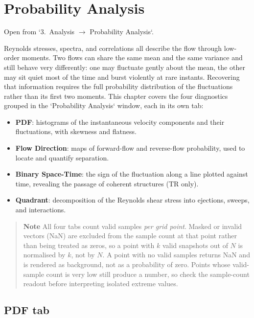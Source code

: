 \section{Probability Analysis}
\label{ch:probability}

Open from `3.\ Analysis $\to$ Probability Analysis`.

Reynolds stresses, spectra, and correlations all describe the flow through low-order moments. Two flows can share the same mean and the same variance and still behave very differently: one may fluctuate gently about the mean, the other may sit quiet most of the time and burst violently at rare instants. Recovering that information requires the full probability distribution of the fluctuations rather than its first two moments. This chapter covers the four diagnostics grouped in the `Probability Analysis` window, each in its own tab:

\begin{itemize}[leftmargin=1.5em]
  \item \textbf{PDF}: histograms of the instantaneous velocity components and their fluctuations, with skewness and flatness.
  \item \textbf{Flow Direction}: maps of forward-flow and reverse-flow probability, used to locate and quantify separation.
  \item \textbf{Binary Space-Time}: the sign of the fluctuation along a line plotted against time, revealing the passage of coherent structures (TR only).
  \item \textbf{Quadrant}: decomposition of the Reynolds shear stress into ejections, sweeps, and interactions.
\end{itemize}

\begin{quote}
\textbf{Note}
All four tabs count valid samples \emph{per grid point}. Masked or invalid vectors (NaN) are excluded from the sample count at that point rather than being treated as zeros, so a point with $k$ valid snapshots out of $N$ is normalised by $k$, not by $N$. A point with no valid samples returns NaN and is rendered as background, not as a probability of zero. Points whose valid-sample count is very low still produce a number, so check the sample-count readout before interpreting isolated extreme values.
\end{quote}

\subsection{PDF tab}

